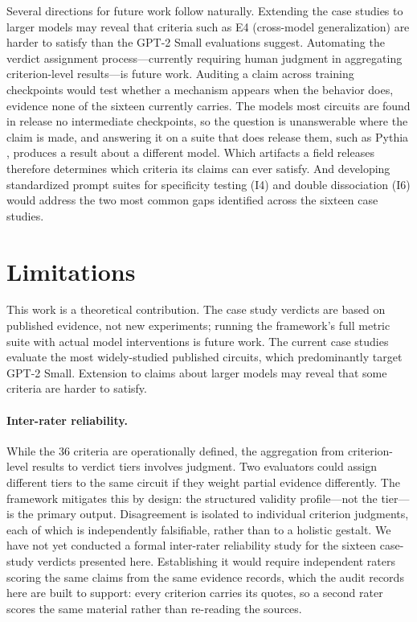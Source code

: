 \documentclass{article}
\begin{document}
Several directions for future work follow naturally. Extending the case studies to larger models may reveal that criteria such as E4 (cross-model generalization) are harder to satisfy than the GPT-2 Small evaluations suggest. Automating the verdict assignment process---currently requiring human judgment in aggregating criterion-level results---is future work. Auditing a claim across training checkpoints would test whether a mechanism appears when the behavior does, evidence none of the sixteen currently carries. The models most circuits are found in release no intermediate checkpoints, so the question is unanswerable where the claim is made, and answering it on a suite that does release them, such as Pythia \citep{biderman2023pythia}, produces a result about a different model. Which artifacts a field releases therefore determines which criteria its claims can ever satisfy. And developing standardized prompt suites for specificity testing (I4) and double dissociation (I6) would address the two most common gaps identified across the sixteen case studies.

\section{Limitations}
\label{sec:limitations}

This work is a theoretical contribution. The case study verdicts are based on published evidence, not new experiments; running the framework's full metric suite with actual model interventions is future work. The current case studies evaluate the most widely-studied published circuits, which predominantly target GPT-2 Small. Extension to claims about larger models may reveal that some criteria are harder to satisfy.

\paragraph{Inter-rater reliability.} While the 36 criteria are operationally defined, the aggregation from criterion-level results to verdict tiers involves judgment. Two evaluators could assign different tiers to the same circuit if they weight partial evidence differently. The framework mitigates this by design: the structured validity profile---not the tier---is the primary output. Disagreement is isolated to individual criterion judgments, each of which is independently falsifiable, rather than to a holistic gestalt. We have not yet conducted a formal inter-rater reliability study for the sixteen case-study verdicts presented here. Establishing it would require independent raters scoring the same claims from the same evidence records, which the audit records here are built to support: every criterion carries its quotes, so a second rater scores the same material rather than re-reading the sources.
\end{document}
